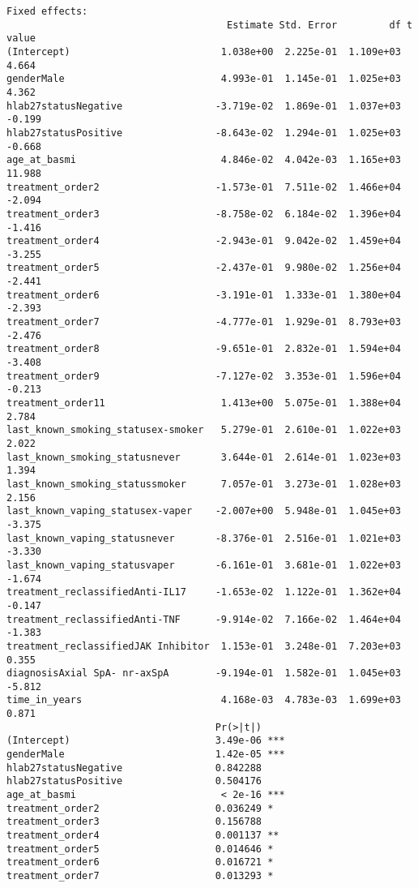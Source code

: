 \documentclass[
  letterpaper,
  DIV=11,
  numbers=noendperiod]{scrartcl}
\begin{document}
\begin{verbatim}
Fixed effects:
                                      Estimate Std. Error         df t value
(Intercept)                          1.038e+00  2.225e-01  1.109e+03   4.664
genderMale                           4.993e-01  1.145e-01  1.025e+03   4.362
hlab27statusNegative                -3.719e-02  1.869e-01  1.037e+03  -0.199
hlab27statusPositive                -8.643e-02  1.294e-01  1.025e+03  -0.668
age_at_basmi                         4.846e-02  4.042e-03  1.165e+03  11.988
treatment_order2                    -1.573e-01  7.511e-02  1.466e+04  -2.094
treatment_order3                    -8.758e-02  6.184e-02  1.396e+04  -1.416
treatment_order4                    -2.943e-01  9.042e-02  1.459e+04  -3.255
treatment_order5                    -2.437e-01  9.980e-02  1.256e+04  -2.441
treatment_order6                    -3.191e-01  1.333e-01  1.380e+04  -2.393
treatment_order7                    -4.777e-01  1.929e-01  8.793e+03  -2.476
treatment_order8                    -9.651e-01  2.832e-01  1.594e+04  -3.408
treatment_order9                    -7.127e-02  3.353e-01  1.596e+04  -0.213
treatment_order11                    1.413e+00  5.075e-01  1.388e+04   2.784
last_known_smoking_statusex-smoker   5.279e-01  2.610e-01  1.022e+03   2.022
last_known_smoking_statusnever       3.644e-01  2.614e-01  1.023e+03   1.394
last_known_smoking_statussmoker      7.057e-01  3.273e-01  1.028e+03   2.156
last_known_vaping_statusex-vaper    -2.007e+00  5.948e-01  1.045e+03  -3.375
last_known_vaping_statusnever       -8.376e-01  2.516e-01  1.021e+03  -3.330
last_known_vaping_statusvaper       -6.161e-01  3.681e-01  1.022e+03  -1.674
treatment_reclassifiedAnti-IL17     -1.653e-02  1.122e-01  1.362e+04  -0.147
treatment_reclassifiedAnti-TNF      -9.914e-02  7.166e-02  1.464e+04  -1.383
treatment_reclassifiedJAK Inhibitor  1.153e-01  3.248e-01  7.203e+03   0.355
diagnosisAxial SpA- nr-axSpA        -9.194e-01  1.582e-01  1.045e+03  -5.812
time_in_years                        4.168e-03  4.783e-03  1.699e+03   0.871
                                    Pr(>|t|)    
(Intercept)                         3.49e-06 ***
genderMale                          1.42e-05 ***
hlab27statusNegative                0.842288    
hlab27statusPositive                0.504176    
age_at_basmi                         < 2e-16 ***
treatment_order2                    0.036249 *  
treatment_order3                    0.156788    
treatment_order4                    0.001137 ** 
treatment_order5                    0.014646 *  
treatment_order6                    0.016721 *  
treatment_order7                    0.013293 *  

\end{verbatim}
\end{document}
